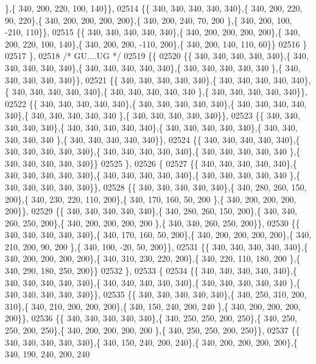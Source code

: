 \begin{DoxyCode}
      \},\{ 340, 200, 220, 100, 140\}\},
02514 \{\{ 340, 340, 340, 340, 340\},\{ 340, 200, 220,  90, 220\},\{ 340, 200, 200, 200, 200\},\{ 340, 200, 240,  70, 200
      \},\{ 340, 200, 100, -210, 110\}\},
02515 \{\{ 340, 340, 340, 340, 340\},\{ 340, 200, 200, 200, 200\},\{ 340, 200, 220, 100, 140\},\{ 340, 200, 200, -110, 
      200\},\{ 340, 200, 140, 110,  60\}\}
02516 \}
02517 \},
02518 \textcolor{comment}{/* GU....UG */}
02519 \{\{
02520 \{\{ 340, 340, 340, 340, 340\},\{ 340, 340, 340, 340, 340\},\{ 340, 340, 340, 340, 340\},\{ 340, 340, 340, 340, 340
      \},\{ 340, 340, 340, 340, 340\}\},
02521 \{\{ 340, 340, 340, 340, 340\},\{ 340, 340, 340, 340, 340\},\{ 340, 340, 340, 340, 340\},\{ 340, 340, 340, 340, 340
      \},\{ 340, 340, 340, 340, 340\}\},
02522 \{\{ 340, 340, 340, 340, 340\},\{ 340, 340, 340, 340, 340\},\{ 340, 340, 340, 340, 340\},\{ 340, 340, 340, 340, 340
      \},\{ 340, 340, 340, 340, 340\}\},
02523 \{\{ 340, 340, 340, 340, 340\},\{ 340, 340, 340, 340, 340\},\{ 340, 340, 340, 340, 340\},\{ 340, 340, 340, 340, 340
      \},\{ 340, 340, 340, 340, 340\}\},
02524 \{\{ 340, 340, 340, 340, 340\},\{ 340, 340, 340, 340, 340\},\{ 340, 340, 340, 340, 340\},\{ 340, 340, 340, 340, 340
      \},\{ 340, 340, 340, 340, 340\}\}
02525 \},
02526 \{
02527 \{\{ 340, 340, 340, 340, 340\},\{ 340, 340, 340, 340, 340\},\{ 340, 340, 340, 340, 340\},\{ 340, 340, 340, 340, 340
      \},\{ 340, 340, 340, 340, 340\}\},
02528 \{\{ 340, 340, 340, 340, 340\},\{ 340, 280, 260, 150, 200\},\{ 340, 230, 220, 110, 200\},\{ 340, 170, 160,  50, 200
      \},\{ 340, 200, 200, 200, 200\}\},
02529 \{\{ 340, 340, 340, 340, 340\},\{ 340, 280, 260, 150, 200\},\{ 340, 340, 260, 250, 200\},\{ 340, 200, 200, 200, 200
      \},\{ 340, 340, 260, 250, 200\}\},
02530 \{\{ 340, 340, 340, 340, 340\},\{ 340, 170, 160,  50, 200\},\{ 340, 200, 200, 200, 200\},\{ 340, 210, 200,  90, 200
      \},\{ 340, 100, -20,  50, 200\}\},
02531 \{\{ 340, 340, 340, 340, 340\},\{ 340, 200, 200, 200, 200\},\{ 340, 310, 230, 220, 200\},\{ 340, 220, 110, 180, 200
      \},\{ 340, 290, 180, 250, 200\}\}
02532 \},
02533 \{
02534 \{\{ 340, 340, 340, 340, 340\},\{ 340, 340, 340, 340, 340\},\{ 340, 340, 340, 340, 340\},\{ 340, 340, 340, 340, 340
      \},\{ 340, 340, 340, 340, 340\}\},
02535 \{\{ 340, 340, 340, 340, 340\},\{ 340, 250, 310, 200, 310\},\{ 340, 210, 200, 200, 200\},\{ 340, 150, 240, 200, 240
      \},\{ 340, 200, 200, 200, 200\}\},
02536 \{\{ 340, 340, 340, 340, 340\},\{ 340, 250, 250, 200, 250\},\{ 340, 250, 250, 200, 250\},\{ 340, 200, 200, 200, 200
      \},\{ 340, 250, 250, 200, 250\}\},
02537 \{\{ 340, 340, 340, 340, 340\},\{ 340, 150, 240, 200, 240\},\{ 340, 200, 200, 200, 200\},\{ 340, 190, 240, 200, 240

\end{DoxyCode}
